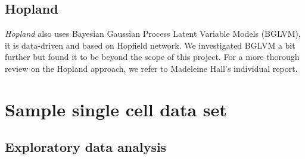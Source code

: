 \documentclass[journal, a4paper]{IEEEtran}
\begin{document}

\subsection{Hopland}
\textit{Hopland} \cite{hopland} also uses Bayesian Gaussian Process Latent Variable Models (BGLVM), it is data-driven and based on Hopfield network. 
We investigated BGLVM a bit further but found it to be beyond the scope of this project.
For a more thorough review on the Hopland approach, we refer to Madeleine Hall's individual report.




\section{Sample single cell data set}



\subsection{Exploratory data analysis}
\end{document}
